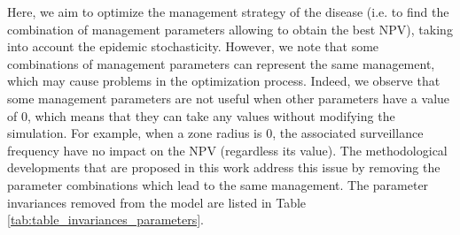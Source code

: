 Here, we aim to optimize the management strategy of the disease (i.e. to find the combination of management parameters allowing to obtain the best NPV), 
taking into account the epidemic stochasticity. However, we note that some combinations of management parameters can represent the same management, 
which may cause problems in the optimization process. Indeed, we observe that some management parameters are not useful when other parameters have a value of 0, 
which means that they can take any values without modifying the simulation. For example, when a zone radius is 0, the associated surveillance frequency have no impact on the NPV (regardless its value). 
The methodological developments that are proposed in this work address this issue by removing the parameter combinations which lead to the same management. 
The parameter invariances removed from the model are listed in Table \ref{tab:table_invariances_parameters}.

